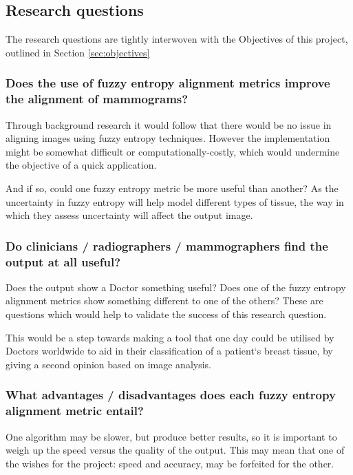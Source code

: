 \subsection{Research questions}
\label{ssec:research-qs}

The research questions are tightly interwoven with the Objectives of this project, outlined in Section \ref{sec:objectives}

\subsubsection{Does the use of fuzzy entropy alignment metrics improve the alignment of mammograms?}

Through background research it would follow that there would be no issue in aligning images using fuzzy entropy techniques. However the implementation might be somewhat difficult or computationally-costly, which would undermine the objective of a quick application.

And if so, could one fuzzy entropy metric be more useful than another? As the uncertainty in fuzzy entropy will help model different types of tissue, the way in which they assess uncertainty will affect the output image.

\subsubsection{Do clinicians / radiographers / mammographers find the output at all useful?}

Does the output show a Doctor something useful? Does one of the fuzzy entropy alignment metrics show something different to one of the others? These are questions which would help to validate the success of this research question.

This would be a step towards making a tool that one day could be utilised by Doctors worldwide to aid in their classification of a patient`s breast tissue, by giving a second opinion based on image analysis.

\subsubsection{What advantages / disadvantages does each fuzzy entropy alignment metric entail?}

One algorithm may be slower, but produce better results, so it is important to weigh up the speed versus the quality of the output. This may mean that one of the wishes for the project: speed and accuracy, may be forfeited for the other.
